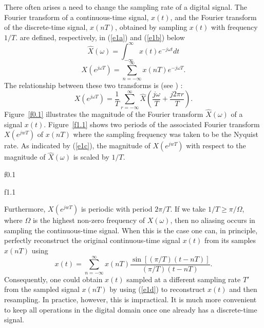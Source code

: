 	There often arises a need to change the sampling
rate of a digital signal. The Fourier transform of a continuous-time signal, 
$x(t)$, and the Fourier transform of the discrete-time signal, $x(nT)$,
obtained by sampling $x(t)$ with frequency $1/T$. are defined, respectively, 
in (\ref{e1a})
and (\ref{e1b}) below
%
\begin{equation}
\hat{X}(\omega)=\int_{-\infty}^{\infty}x(t)e^{-j\omega t}dt
\label{e1a}
\end{equation}
%
%
\begin{equation}
X(e^{j\omega T})=\sum_{n=-\infty}^{\infty}x(nT)e^{-j\omega T}.
\label{e1b}
\end{equation}
%
The relationship between these two transforms is (see \cite{oppen}) :
%
\begin{equation}
X(e^{j\omega T})=\frac{1}{T}\sum_{r=-\infty}^{\infty}
\hat{X}(\frac{j\omega}{T}+\frac{j2\pi r}{T}).
\label{e1c}
\end{equation}
%
Figure~\ref{f0.1}
illustrates the magnitude of the Fourier 
transform $\hat{X}(\omega)$ of a signal $x(t)$. 
Figure~\ref{f1.1} shows two periods of the associated Fourier 
transform $X(e^{jwT})$
of $x(nT)$ where the sampling frequency was taken
to be the Nyquist rate.  As indicated by (\ref{e1c}), 
the magnitude of $X(e^{jwT})$ with
respect to the magnitude of $\hat{X}(\omega)$ is scaled by $1/T$.
%

{f0.1}

%
%

{f1.1}


%
Furthermore, $X(e^{jwT})$ is periodic with period $2\pi/T$.  If
we take $1/T\ge\pi/\Omega$, where $\Omega$ is the highest
non-zero frequency of $X(\omega)$, then no aliasing occurs in sampling the 
continuous-time signal.  When this is the case one can, in principle,
perfectly reconstruct the original continuous-time signal $x(t)$
from its samples $x(nT)$ using
%
\begin{equation}
x(t)=\sum_{n=-\infty}^{\infty}
x(nT)\frac{\sin[(\pi/T)(t-nT)]}{(\pi/T)(t-nT)}.
\label{e1d}
\end{equation}
%
Consequently, one could obtain $x(t)$ sampled at a different sampling
rate $T'$ from the sampled signal $x(nT)$ by using (\ref{e1d}) 
to reconstruct $x(t)$ and
then resampling.  In practice, however, this is impractical.  It is
much more convenient to keep all operations in the digital domain
once one already has a discrete-time signal.

